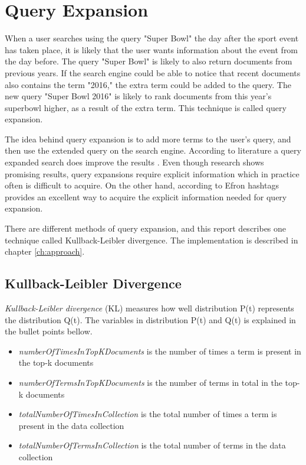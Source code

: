 \section{Query Expansion}
\label{sec:query-expansion}

When a user searches using the query "Super Bowl" the day after the sport event has taken place,
it is likely that the user wants information about the event from the day before.
The query "Super Bowl" is likely to also return documents from previous years.
If the search engine could be able to notice that recent documents also contains the term "2016,"
the extra term could be added to the query.
The new query "Super Bowl 2016" is likely to rank documents from this year's superbowl higher, as a result of the extra term.
This technique is called query expansion.

The idea behind query expansion is to add more terms to the user's query, and then use the extended query on the search engine.
According to literature a query expanded search does improve the results \cite[ch. 5]{ir-book}.
Even though research shows promising results, query expansions require explicit information which in practice often is difficult to acquire.
On the other hand, according to Efron \cite{ir-hashtag} hashtags provides an excellent way to acquire the explicit information needed for query expansion.

There are different methods of query expansion, and this report describes one technique called Kullback-Leibler divergence.
The implementation is described in chapter \ref{ch:approach}.

\subsection{Kullback-Leibler Divergence}
\textit{Kullback-Leibler divergence} (KL) measures how well distribution P(t) represents the distribution Q(t).
The variables in distribution P(t) and Q(t) is explained in the bullet points bellow.

\begin{itemize}
	\item \textit{numberOfTimesInTopKDocuments} is the number of times a term is present in the top-k documents
	\item \textit{numberOfTermsInTopKDocuments} is the number of terms in total in the top-k documents
	\item \textit{totalNumberOfTimesInCollection} is the total number of times a term is present in the data collection
	\item \textit{totalNumberOfTermsInCollection} is the total number of terms in the data collection
\end{itemize}

